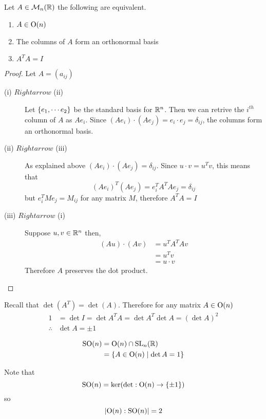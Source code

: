 \documentclass{article}
\begin{document}
\begin{lemma}[Matrices in $\Or(n)$]
    Let $A \in \mathcal{M}_n(\mathbb{R})$ the following are equivalent.
    \begin{enumerate}
        \item $A \in \mathrm{O}(n)$
        \item The columns of $A$ form an orthonormal basis
        \item $A^TA = I$
    \end{enumerate}
\end{lemma}
\begin{proof}
    Let $A = (a_{ij})$
    \begin{description}
        \item[(i) $Rightarrow$ (ii)] Let $\left\{ e_1, \cdots e_2 \right\}$ be the standard basis for $\mathbb{R}^n$. 
        Then we can retrive the $i^{th}$ column of $A$ as $Ae_i$. Since $(Ae_i) \cdot (Ae_j) = e_i \cdot e_j = \delta_{ij}$,
        the columns form an orthonormal basis.
        \item[(ii) $Rightarrow$ (iii)] As explained above $(Ae_i) \cdot (Ae_j) = \delta_{ij}$. 
        Since $u \cdot v = u^Tv$, this means that 
        \[
            (Ae_i)^T(Ae_j) = e^T_iA^TAe_j = \delta_{ij}
        \]
        but $e^T_iMe_j = M_{ij}$ for any matrix $M$, therefore $A^TA = I$
        \item[(iii) $Rightarrow$ (i)] Suppose $u, v \in \mathbb{R}^n$ then,
        \begin{align*}
            (Au) \cdot (Av) &= u^TA^TAv \\
            &= u^Tv \tag{since $A^TA = I$}\\
            &= u \cdot v
        \end{align*}
        Therefore $A$ preserves the dot product.
    \end{description}
\end{proof}

Recall that $\det(A^T) = \det(A)$. Therefore for any matrix $A \in \mathrm{O}(n)$
\begin{align*}
    1 &= \det I = \det A^T A = \det A^T \det A = (\det A)^2 \\
    \therefore &\det A = \pm 1
\end{align*}

\begin{defi}
    \begin{align*}
        \mathrm{SO}(n) &= \mathrm{O}(n) \cap \mathrm{SL}_n(\mathbb{R}) \\
        &= \left\{ A \in \mathrm{O}(n) \mid \det A = 1 \right\} \\
    \end{align*}
\end{defi}
\begin{remark}
    Note that
    \[
        \mathrm{SO}(n) = \ker(\det: \mathrm{O}(n) \rightarrow \left\{ \pm 1 \right\})  
    \]
    so 
    \[
        \left\lvert \mathrm{O}(n) : \mathrm{SO}(n)\right\rvert = 2  
    \]
\end{remark}
\end{document}
